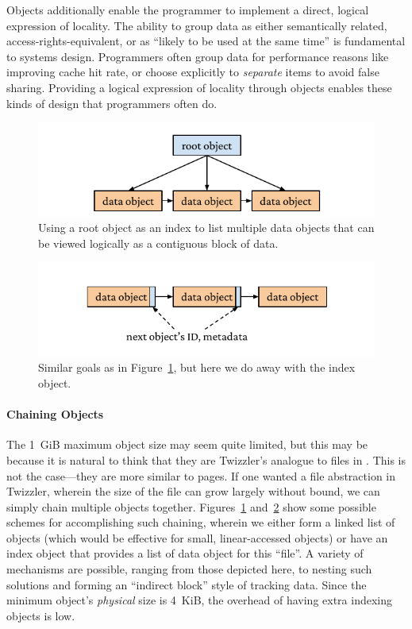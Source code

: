 Objects additionally enable the programmer to implement a direct, logical expression of locality.
The ability to group data as either semantically related, access-rights-equivalent, or as ``likely to be used at the
same time'' is fundamental to systems design. Programmers often group data for performance reasons like improving cache
hit rate, or choose explicitly to \emph{separate} items to avoid false sharing. Providing a logical expression of
locality through objects enables these kinds of design that programmers often do.
\begin{figure}
    \centering
    \includegraphics[width=\linewidth]{fig/objectchain1.pdf}
    \caption[Chaining objects]{Using a root object as an index to list multiple data objects that can be viewed logically as a contiguous block of data.}
    \label{fig:objchain1}
\end{figure}

\begin{figure}
    \centering
    \includegraphics[width=\linewidth]{fig/objectchain2.pdf}
    \caption[Alternative object chaining]{Similar goals as in Figure~\ref{fig:objchain1}, but here we do away with the index object.}
    \label{fig:objchain2}
\end{figure}
\paragraph{Chaining Objects}
The 1~GiB maximum object size may seem quite limited, but this may be because it is natural to think that they are
Twizzler's analogue to files in \unix. This is not the case---they are more similar to pages. If one wanted a
file abstraction in Twizzler, wherein the size of the file can grow largely without bound, we can simply chain multiple
objects together. Figures~\ref{fig:objchain1} and~\ref{fig:objchain2} show some possible schemes for accomplishing such
chaining, wherein we either form a linked list of objects (which would be effective for small, linear-accessed objects)
or have an index object that provides a list of data object for this ``file''. A variety of mechanisms are possible,
ranging from those depicted here, to nesting such solutions and forming an ``indirect block'' style of tracking data.
Since the minimum object's \emph{physical} size is 4~KiB, the overhead of having extra indexing objects is low.



